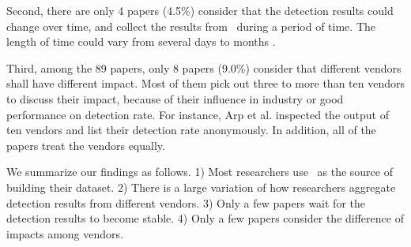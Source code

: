 Second, there are only 4 papers (4.5\%) consider that the detection results could change over time, and collect the results from \vt\ during a period of time. 
The length of time could vary from several days \cite{kharraz2016unveil, rajab2013camp} to months \cite{neeles, wressnegger2017looking}. 

Third, among the 89 papers, only 8 papers (9.0\%) consider that different vendors shall have different impact. 
Most of them pick out three to more than ten vendors to discuss their impact, because of their influence in industry or good performance on detection rate. 
For instance, Arp et al. \cite{arp2014drebin} inspected the output of ten vendors and list their detection rate anonymously. 
In addition, all of the papers treat the vendors equally. %

We summarize our findings as follows. 
1) Most researchers use \vt\ as the source of building their dataset. 
2) There is a large variation of how researchers aggregate detection results from different vendors. 
3) Only a few papers wait for the detection results to become stable.
4) Only a few papers consider the difference of impacts among  vendors.






